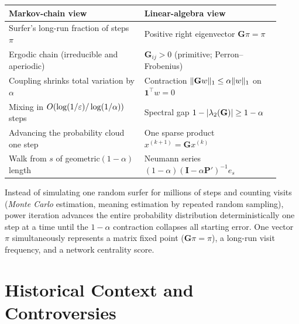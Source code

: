 \begin{center}
\begin{tabular}{@{}p{0.46\linewidth}p{0.46\linewidth}@{}}
\toprule
\textbf{Markov-chain view} & \textbf{Linear-algebra view}\\
\midrule
Surfer's long-run fraction of steps $\pi$ & Positive right eigenvector $\mathbf{G}\pi = \pi$\\
Ergodic chain (irreducible and aperiodic) & $\mathbf{G}_{ij} > 0$ (primitive; Perron--Frobenius)\\
Coupling shrinks total variation by $\alpha$ & Contraction $\lVert\mathbf{G}w\rVert_1 \le \alpha\lVert w\rVert_1$ on $\mathbf{1}^\top w = 0$\\
Mixing in $O(\log(1/\varepsilon)/\log(1/\alpha))$ steps & Spectral gap $1 - \lvert\lambda_2(\mathbf{G})\rvert \ge 1-\alpha$\\
Advancing the probability cloud one step & One sparse product $x^{(k+1)} = \mathbf{G}x^{(k)}$\\
Walk from $s$ of geometric$(1-\alpha)$ length & Neumann series $(1-\alpha)(\mathbf{I}-\alpha\mathbf{P}')^{-1}e_s$\\
\bottomrule
\end{tabular}
\end{center}

\begin{aestheticbox}
Instead of simulating one random surfer for millions of steps and counting visits (\emph{Monte Carlo} estimation, meaning estimation by repeated random sampling), power iteration advances the entire probability distribution deterministically one step at a time until the $1-\alpha$ contraction collapses all starting error. One vector $\pi$ simultaneously represents a matrix fixed point ($\mathbf{G}\pi = \pi$), a long-run visit frequency, and a network centrality score.
\end{aestheticbox}

\section{Historical Context and Controversies}

